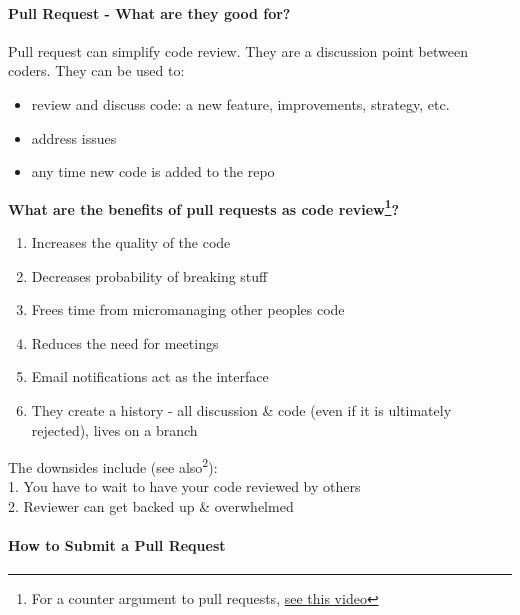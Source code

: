 \documentclass[
  letterpaper,
  DIV=11,
  numbers=noendperiod]{scrreprt}
\let\oldparagraph\paragraph
\renewcommand{\paragraph}[1]{\oldparagraph{#1}\mbox{}}
\providecommand{\tightlist}{%
  \setlength{\itemsep}{0pt}\setlength{\parskip}{0pt}}\usepackage{longtable,booktabs,array}
\begin{document}
\paragraph{Pull Request - What are they good
for?}\label{pull-request---what-are-they-good-for}

Pull request can simplify code review. They are a discussion point
between coders. They can be used to:

\begin{itemize}
\tightlist
\item
  review and discuss code: a new feature, improvements, strategy, etc.
\item
  address issues
\item
  any time new code is added to the repo
\end{itemize}

\textbf{What are the benefits of pull requests as code
review\footnote{For a counter argument to pull requests,
  \href{https://youtu.be/ASOSEiJCyEM?t=275}{see this video}}?}

\begin{enumerate}
\def\labelenumi{\arabic{enumi}.}
\tightlist
\item
  Increases the quality of the code
\item
  Decreases probability of breaking stuff
\item
  Frees time from micromanaging other peoples code
\item
  Reduces the need for meetings
\item
  Email notifications act as the interface
\item
  They create a history - all discussion \& code (even if it is
  ultimately rejected), lives on a branch
\end{enumerate}

The downsides include (see also\textsuperscript{2}):\\
1. You have to wait to have your code reviewed by others\\
2. Reviewer can get backed up \& overwhelmed

\paragraph{How to Submit a Pull
Request}\label{how-to-submit-a-pull-request}
\end{document}
